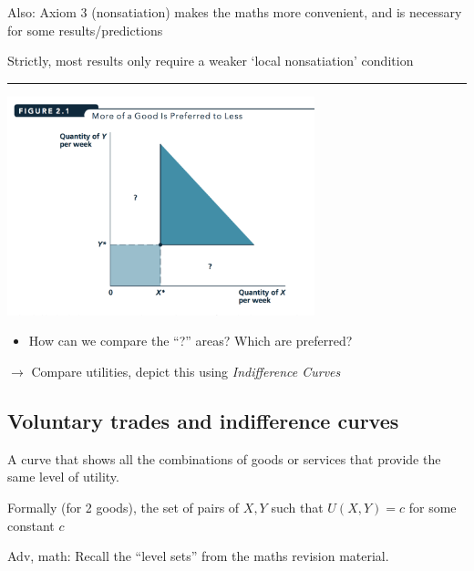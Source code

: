 \documentclass[]{article}
\providecommand{\tightlist}{%
  \setlength{\itemsep}{0pt}\setlength{\parskip}{0pt}}
\begin{document}
\bigskip

Also: Axiom 3 (nonsatiation) makes the maths more convenient, and is necessary for some results/predictions

Strictly, most results only require a weaker `local nonsatiation' condition

\begin{center}\rule{0.5\linewidth}{\linethickness}\end{center}

\includegraphics[height=2.5in]{picsfigs/moreisbetter.png}

\begin{itemize}
\tightlist
\item
  How can we compare the ``?'' areas? Which are preferred?
\end{itemize}

\(\rightarrow\) Compare utilities, depict this using \emph{Indifference Curves}

\hypertarget{voluntary-trades-and-indifference-curves}{%
\subsection{Voluntary trades and indifference curves}\label{voluntary-trades-and-indifference-curves}}

\begin{description}
\tightlist
\item[Indifference curve]
A curve that shows all the combinations of goods or services that provide the same level of utility.
\end{description}

\medskip

Formally (for 2 goods), the set of pairs of \({X,Y}\) such that \(U(X,Y)=c\) for some constant \(c\)

Adv, math: Recall the ``level sets'' from the maths revision material.
\end{document}
